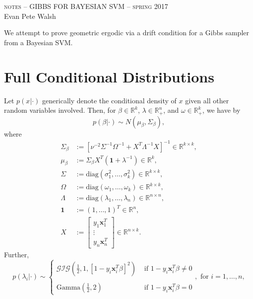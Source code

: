 \documentclass[12pt]{article}
\begin{document}
\thispagestyle{empty}
\begin{center}
  \Large \textsc{notes -- GIBBS FOR BAYESIAN SVM -- spring 2017} \\ 
  \vspace{5mm}
  \large Evan Pete Walsh
\end{center}
\vspace{1cm}

We attempt to prove geometric ergodic via a drift condition for a Gibbs sampler from a Bayesian SVM. 

\section{Full Conditional Distributions}

Let $p(x|\cdot)$ generically denote the conditional density of $x$ given all other random variables involved. Then, for $\beta \in \mathbb{R}^{k}$,
$\lambda \in \mathbb{R}_{+}^{n}$, and $\omega \in \mathbb{R}_{+}^{k}$, we have by \cite{svm}
\[
  p(\beta|\cdot) \sim N(\mu_{\beta}, \Sigma_{\beta}),
\]
where 
\begin{align*}
  \Sigma_{\beta} & := [\nu^{-2}\Sigma^{-1}\Omega^{-1} + X^{T}\Lambda^{-1} X]^{-1} \in \mathbb{R}^{k\times k}, \\
  \mu_{\beta} & := \Sigma_{\beta}X^{T}(\bm{1} + \lambda^{-1}) \in \mathbb{R}^{k}, \\
  \Sigma & := \text{diag}(\sigma_1^2,\dots, \sigma_k^2) \in \mathbb{R}^{k\times k}, \\
  \Omega & := \text{diag}(\omega_1, \dots, \omega_k) \in \mathbb{R}^{k\times k}, \\
  \Lambda & := \text{diag}(\lambda_1, \dots, \lambda_n) \in \mathbb{R}^{n\times n}, \\
  \bm{1} & := (1, \dots, 1)^T \in \mathbb{R}^{n}, \\
  X & := \begin{bmatrix}
    y_1 \bm{x}_1^T \\
    \vdots \\
    y_n \bm{x}_n^T 
  \end{bmatrix} \in \mathbb{R}^{n\times k}.
\end{align*}
Further,
\[
  p(\lambda_i|\cdot) \sim \left\{ \begin{array}{cl}
      \mathcal{GIG}\left( \frac{1}{2}, 1, [1 - y_i \bm{x}_i^T\beta]^2 \right) & \text{ if } 1-y_i \bm{x}_i^T \beta \neq 0 \\ \\
      \text{Gamma}\left( \frac{1}{2}, 2 \right) & \text{ if } 1 - y_i\bm{x}_i^T\beta = 0
  \end{array} \right., \text{ for } i=1,\dots, n,
\]
\end{document}
